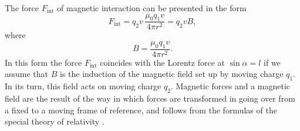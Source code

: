 The force $F_{\text{int}}$ of magnetic interaction can be presented in the form
\begin{equation*}%
F_{\text{int}} = q_{2}v\, \frac{\mu_{0}q_{1}v}{4 \pi r^{2}} = q_{2}vB,
\end{equation*}
where
\begin{equation*}%
B = \frac{\mu_{0}q_{1}v}{4 \pi r^{2}}.
\end{equation*}
In this form the force $F_{\text{int}}$ coincides with the Lorentz force at $\sin \alpha = l$  if we assume that $B$ is the induction of the magnetic field  set up by moving charge $q_{1}$. In its turn, this field acts on moving charge $q_{2}$. Magnetic forces and a magnetic field are the result of the way in which forces are transformed in going over from a fixed to a moving frame of reference, and follows from the formulas of the special theory of relativity .


